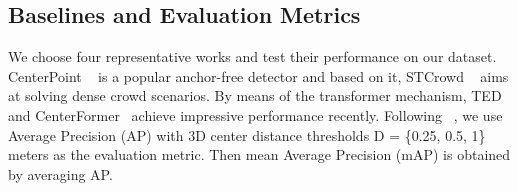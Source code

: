 


\subsection{Baselines and Evaluation Metrics}
We choose four representative works and test their performance on our dataset. CenterPoint ~\cite{centerpoint} is a popular anchor-free detector and based on it, STCrowd ~\cite{cong2022stcrowd} aims at solving dense crowd scenarios. By means of the transformer mechanism, TED~\cite{TED} and CenterFormer~\cite{centerformer} achieve impressive performance recently. Following ~\cite{cong2022stcrowd,caesar2020nuscenes}, we use Average Precision (AP) with 3D center distance thresholds D = \{0.25, 0.5, 1\} meters as the evaluation metric. Then mean Average Precision (mAP) is obtained by averaging AP.



